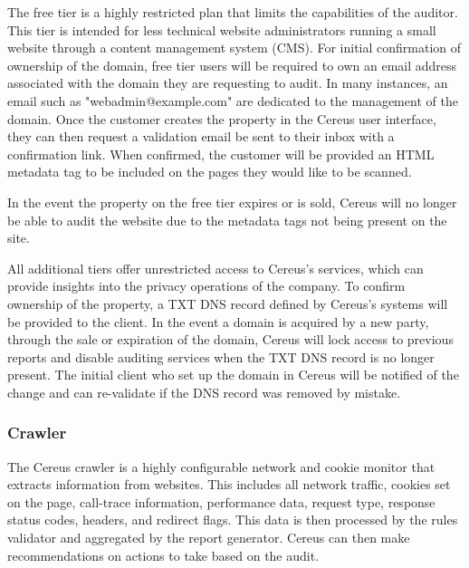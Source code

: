 The free tier is a highly restricted plan that limits the capabilities of the auditor. This tier is intended for less technical website administrators running a small website through a content management system (CMS). For initial confirmation of ownership of the domain, free tier users will be required to own an email address associated with the domain they are requesting to audit. In many instances, an email such as "webadmin@example.com" are dedicated to the management of the domain. Once the customer creates the property in the Cereus user interface, they can then request a validation email be sent to their inbox with a confirmation link. When confirmed, the customer will be provided an HTML metadata tag to be included on the pages they would like to be scanned.

In the event the property on the free tier expires or is sold, Cereus will no longer be able to audit the website due to the metadata tags not being present on the site. 


All additional tiers offer unrestricted access to Cereus's services, which can provide insights into the privacy operations of the company. To confirm ownership of the property, a TXT DNS record defined by Cereus's systems will be provided to the client. In the event a domain is acquired by a new party, through the sale or expiration of the domain, Cereus will lock access to previous reports and disable auditing services when the TXT DNS record is no longer present. The initial client who set up the domain in Cereus will be notified of the change and can re-validate if the DNS record was removed by mistake.

\subsubsection{Crawler}

The Cereus crawler is a highly configurable network and cookie monitor that extracts information from websites. This includes all network traffic, cookies set on the page, call-trace information, performance data, request type, response status codes, headers, and redirect flags. This data is then processed by the rules validator and aggregated by the report generator. Cereus can then make recommendations on actions to take based on the audit.

